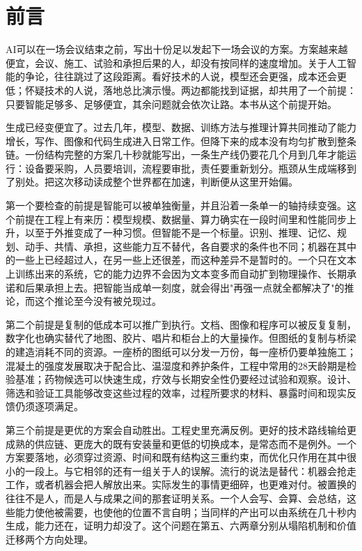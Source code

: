 \chapter*{前\quad 言}

AI可以在一场会议结束之前，写出十份足以发起下一场会议的方案。方案越来越便宜，会议、施工、试验和承担后果的人，却没有按同样的速度增加。关于人工智能的争论，往往跳过了这段距离。看好技术的人说，模型还会更强，成本还会更低；怀疑技术的人说，落地总比演示慢。两边都能找到证据，却共用了一个前提：只要智能足够多、足够便宜，其余问题就会依次让路。本书从这个前提开始。

生成已经变便宜了。过去几年，模型、数据、训练方法与推理计算共同推动了能力增长，写作、图像和代码生成进入日常工作。但降下来的成本没有均匀扩散到整条链。一份结构完整的方案几十秒就能写出，一条生产线仍要花几个月到几年才能运行：设备要采购，人员要培训，流程要审批，责任要重新划分。瓶颈从生成端移到了别处。把这次移动读成整个世界都在加速，判断便从这里开始偏。

第一个要检查的前提是智能可以被单独衡量，并且沿着一条单一的轴持续变强。这个前提在工程上有来历：模型规模、数据量、算力确实在一段时间里和性能同步上升，以至于外推变成了一种习惯。但智能不是一个标量。识别、推理、记忆、规划、动手、共情、承担，这些能力互不替代，各自要求的条件也不同；机器在其中的一些上已经超过人，在另一些上还很差，而这种差异不是暂时的。一个只在文本上训练出来的系统，它的能力边界不会因为文本变多而自动扩到物理操作、长期承诺和后果承担上去。把智能当成单一刻度，就会得出"再强一点就全都解决了"的推论，而这个推论至今没有被兑现过。

第二个前提是复制的低成本可以推广到执行。文档、图像和程序可以被反复复制，数字化也确实替代了地图、胶片、唱片和柜台上的大量操作。但图纸的复制与桥梁的建造消耗不同的资源。一座桥的图纸可以分发一万份，每一座桥仍要单独施工；混凝土的强度发展取决于配合比、温湿度和养护条件，工程中常用的28天龄期是检验基准；药物候选可以快速生成，疗效与长期安全性仍要经过试验和观察。设计、筛选和验证工具能够改变这些过程的效率，过程所要求的材料、暴露时间和现实反馈仍须逐项满足。

第三个前提是更优的方案会自动胜出。工程史里充满反例。更好的技术路线输给更成熟的供应链、更庞大的既有安装量和更低的切换成本，是常态而不是例外。一个方案要落地，必须穿过资源、时间和既有结构这三重约束，而优化只作用在其中很小的一段上。与它相邻的还有一组关于人的误解。流行的说法是替代：机器会抢走工作，或者机器会把人解放出来。实际发生的事情更细碎，也更难对付。被置换的往往不是人，而是人与成果之间的那套证明关系。一个人会写、会算、会总结，这些能力使他被需要，也使他的位置不言自明；当同样的产出可以由系统在几十秒内生成，能力还在，证明力却没了。这个问题在第五、六两章分别从塌陷机制和价值迁移两个方向处理。

